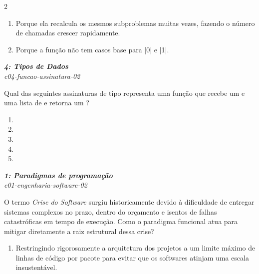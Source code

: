 \documentclass[a4paper,10pt,brazil]{article}
\begin{document}
\begin{multicols}{2}
\begin{enumerate}
  \item Porque ela recalcula os mesmos subproblemas muitas vezes, fazendo o número de chamadas crescer rapidamente.

  \item Porque a função não tem casos base para \haskellinline|0| e \haskellinline|1|.


\end{enumerate}

\begin{flushright}
  \footnotesize
  \textit{\textbf{4: Tipos de Dados}}\\
  \textit{c04-funcao-assinatura-02}\\

\end{flushright}
Qual das seguintes assinaturas de tipo representa uma função que recebe um  e uma lista de  e retorna um ?

\begin{enumerate}
  \item {}

  \item {}

  \item {}

  \item {}

  \item {}


\end{enumerate}

\begin{flushright}
  \footnotesize
  \textit{\textbf{1: Paradigmas de programação}}\\
  \textit{c01-engenharia-software-02}\\

\end{flushright}
O termo \emph{Crise do Software} surgiu historicamente devido à dificuldade de entregar sistemas complexos no prazo, dentro do orçamento e isentos de falhas catastróficas em tempo de execução. Como o paradigma funcional atua para mitigar diretamente a raiz estrutural dessa crise?

\begin{enumerate}
  \item Restringindo rigorosamente a arquitetura dos projetos a um limite máximo de linhas de código por pacote para evitar que os softwares atinjam uma escala insustentável.


\end{enumerate}
\end{multicols}
\end{document}
